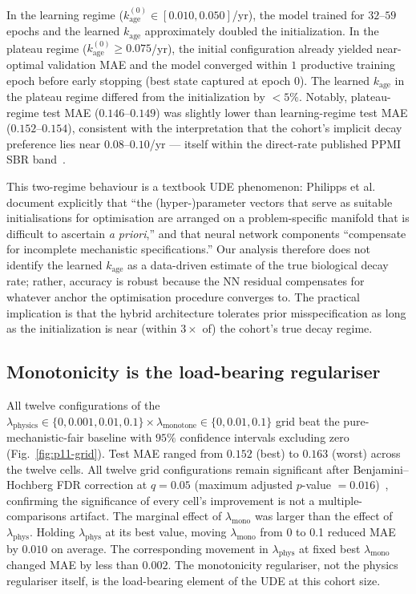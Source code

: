 In the learning regime ($k_\text{age}^{(0)} \in [0.010, 0.050]$/yr), the model trained for $32$--$59$ epochs and the learned $k_\text{age}$ approximately doubled the initialization. In the plateau regime ($k_\text{age}^{(0)} \geq 0.075$/yr), the initial configuration already yielded near-optimal validation MAE and the model converged within $1$ productive training epoch before early stopping (best state captured at epoch 0). The learned $k_\text{age}$ in the plateau regime differed from the initialization by $<5\%$. Notably, plateau-regime test MAE ($0.146$--$0.149$) was slightly lower than learning-regime test MAE ($0.152$--$0.154$), consistent with the interpretation that the cohort's implicit decay preference lies near $0.08$--$0.10$/yr --- itself within the direct-rate published PPMI SBR band~\cite{marek2015ppmi,nandhagopal2009brain}.

This two-regime behaviour is a textbook UDE phenomenon: Philipps et al.~\cite{philipps2025universal} document explicitly that ``the (hyper-)parameter vectors that serve as suitable initialisations for optimisation are arranged on a problem-specific manifold that is difficult to ascertain \textit{a priori},'' and that neural network components ``compensate for incomplete mechanistic specifications.'' Our analysis therefore does not identify the learned $k_\text{age}$ as a data-driven estimate of the true biological decay rate; rather, accuracy is robust because the NN residual compensates for whatever anchor the optimisation procedure converges to. The practical implication is that the hybrid architecture tolerates prior misspecification as long as the initialization is near (within $3\times$ of) the cohort's true decay regime.

\subsection{Monotonicity is the load-bearing regulariser}

All twelve configurations of the $\lambda_{\mathrm{physics}} \in \{0, 0.001, 0.01, 0.1\} \times \lambda_{\mathrm{monotone}} \in \{0, 0.01, 0.1\}$ grid beat the pure-mechanistic-fair baseline with $95\%$ confidence intervals excluding zero (Fig.~\ref{fig:p11-grid}). Test MAE ranged from $0.152$ (best) to $0.163$ (worst) across the twelve cells. All twelve grid configurations remain significant after Benjamini--Hochberg FDR correction at $q = 0.05$ (maximum adjusted $p$-value $= 0.016$)~\cite{benjamini1995fdr}, confirming the significance of every cell's improvement is not a multiple-comparisons artifact. The marginal effect of $\lambda_{\mathrm{mono}}$ was larger than the effect of $\lambda_{\mathrm{phys}}$. Holding $\lambda_{\mathrm{phys}}$ at its best value, moving $\lambda_{\mathrm{mono}}$ from 0 to 0.1 reduced MAE by $0.010$ on average. The corresponding movement in $\lambda_{\mathrm{phys}}$ at fixed best $\lambda_{\mathrm{mono}}$ changed MAE by less than $0.002$. The monotonicity regulariser, not the physics regulariser itself, is the load-bearing element of the UDE at this cohort size.

